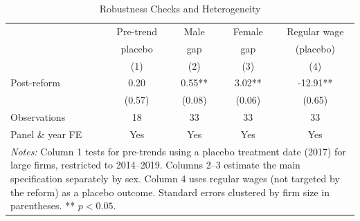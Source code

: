\begin{table}[t]
\centering
\caption{Robustness Checks and Heterogeneity}
\label{tab:robustness}
\begin{tabular}{lcccc}
\toprule
 & Pre-trend & Male & Female & Regular wage \\
 & placebo & gap & gap & (placebo) \\
 & (1) & (2) & (3) & (4) \\
\midrule
Post-reform & 0.20 & 0.55** & 3.02** & -12.91** \\
 & (0.57) & (0.08) & (0.06) & (0.65) \\
Observations & 18 & 33 & 33 & 33 \\
Panel \& year FE & Yes & Yes & Yes & Yes \\
\bottomrule
\multicolumn{5}{p{0.95\textwidth}}{\footnotesize \textit{Notes:} Column 1 tests for pre-trends using a placebo treatment date (2017) for large firms, restricted to 2014--2019. Columns 2--3 estimate the main specification separately by sex. Column 4 uses regular wages (not targeted by the reform) as a placebo outcome. Standard errors clustered by firm size in parentheses. ** $p<0.05$.} \\
\end{tabular}
\end{table}
